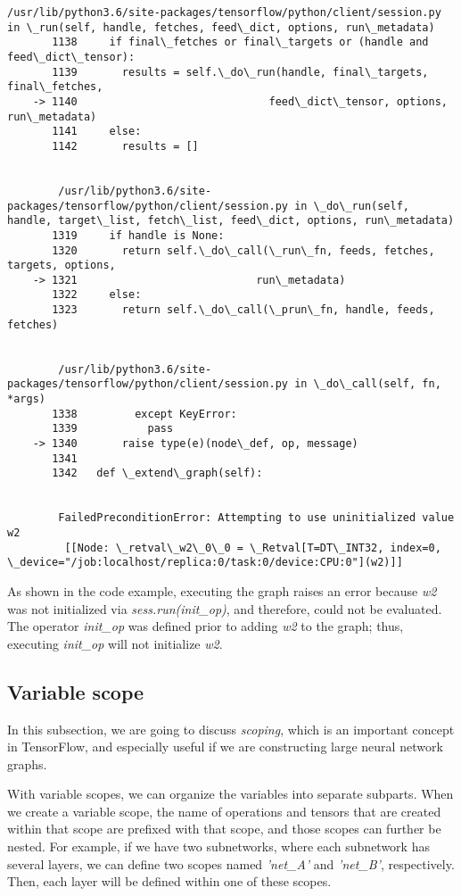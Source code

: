\documentclass[11pt]{article}
\begin{document}
\begin{Verbatim}[commandchars=\\\{\}]
        /usr/lib/python3.6/site-packages/tensorflow/python/client/session.py in \_run(self, handle, fetches, feed\_dict, options, run\_metadata)
       1138     if final\_fetches or final\_targets or (handle and feed\_dict\_tensor):
       1139       results = self.\_do\_run(handle, final\_targets, final\_fetches,
    -> 1140                              feed\_dict\_tensor, options, run\_metadata)
       1141     else:
       1142       results = []


        /usr/lib/python3.6/site-packages/tensorflow/python/client/session.py in \_do\_run(self, handle, target\_list, fetch\_list, feed\_dict, options, run\_metadata)
       1319     if handle is None:
       1320       return self.\_do\_call(\_run\_fn, feeds, fetches, targets, options,
    -> 1321                            run\_metadata)
       1322     else:
       1323       return self.\_do\_call(\_prun\_fn, handle, feeds, fetches)


        /usr/lib/python3.6/site-packages/tensorflow/python/client/session.py in \_do\_call(self, fn, *args)
       1338         except KeyError:
       1339           pass
    -> 1340       raise type(e)(node\_def, op, message)
       1341 
       1342   def \_extend\_graph(self):


        FailedPreconditionError: Attempting to use uninitialized value w2
    	 [[Node: \_retval\_w2\_0\_0 = \_Retval[T=DT\_INT32, index=0, \_device="/job:localhost/replica:0/task:0/device:CPU:0"](w2)]]

    \end{Verbatim}

    As shown in the code example, executing the graph raises an error
because \emph{w2} was not initialized via \emph{sess.run(init\_op)}, and
therefore, could not be evaluated. The operator \emph{init\_op} was
defined prior to adding \emph{w2} to the graph; thus, executing
\emph{init\_op} will not initialize \emph{w2}.

    \subsection{Variable scope}\label{variable-scope}

    In this subsection, we are going to discuss \emph{scoping}, which is an
important concept in TensorFlow, and especially useful if we are
constructing large neural network graphs.

With variable scopes, we can organize the variables into separate
subparts. When we create a variable scope, the name of operations and
tensors that are created within that scope are prefixed with that scope,
and those scopes can further be nested. For example, if we have two
subnetworks, where each subnetwork has several layers, we can define two
scopes named \emph{'net\_A'} and \emph{'net\_B'}, respectively. Then,
each layer will be defined within one of these scopes.
\end{document}
